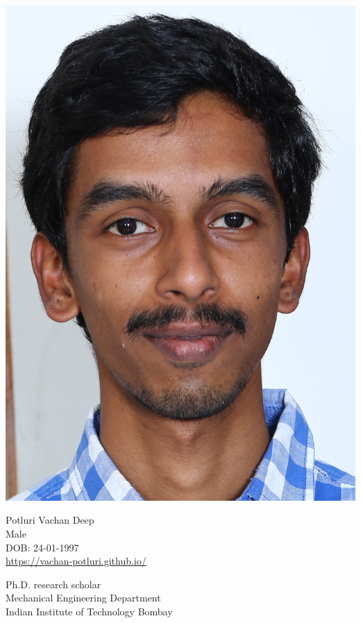 \documentclass[a4paper,10pt]{article}
\begin{document}
\setlength{\intextsep}{0.1em}
\setlength{\textfloatsep}{0.1em}
{
    \noindent\color{infocolor}
    \begin{minipage}{0.07\textwidth}
        \includegraphics[width=\linewidth]{photo}
    \end{minipage}%
    \hspace{1em}
    \begin{minipage}{0.5\textwidth}
    	Potluri Vachan Deep\\
        Male\\
        DOB: 24-01-1997\\
        \url{https://vachan-potluri.github.io/}
    \end{minipage}%
    \hfill
    \begin{minipage}{0.4\textwidth}
    	\flushright
    	Ph.D. research scholar\\
        Mechanical Engineering Department\\
        Indian Institute of Technology Bombay
    \end{minipage}\\
}
\end{document}

